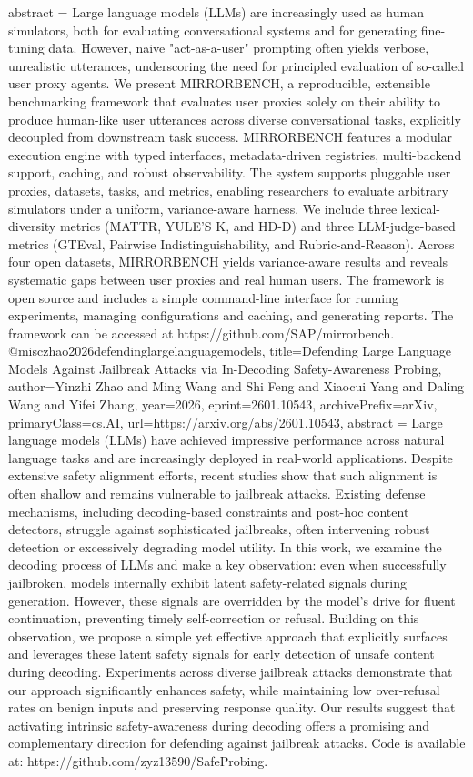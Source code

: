 {      abstract = {Large language models (LLMs) are increasingly used as human simulators, both for evaluating conversational systems and for generating fine-tuning data. However, naive "act-as-a-user" prompting often yields verbose, unrealistic utterances, underscoring the need for principled evaluation of so-called user proxy agents. We present MIRRORBENCH, a reproducible, extensible benchmarking framework that evaluates user proxies solely on their ability to produce human-like user utterances across diverse conversational tasks, explicitly decoupled from downstream task success. MIRRORBENCH features a modular execution engine with typed interfaces, metadata-driven registries, multi-backend support, caching, and robust observability. The system supports pluggable user proxies, datasets, tasks, and metrics, enabling researchers to evaluate arbitrary simulators under a uniform, variance-aware harness. We include three lexical-diversity metrics (MATTR, YULE'S K, and HD-D) and three LLM-judge-based metrics (GTEval, Pairwise Indistinguishability, and Rubric-and-Reason). Across four open datasets, MIRRORBENCH yields variance-aware results and reveals systematic gaps between user proxies and real human users. The framework is open source and includes a simple command-line interface for running experiments, managing configurations and caching, and generating reports. The framework can be accessed at https://github.com/SAP/mirrorbench.}
}@misc{zhao2026defendinglargelanguagemodels,
      title={Defending Large Language Models Against Jailbreak Attacks via In-Decoding Safety-Awareness Probing}, 
      author={Yinzhi Zhao and Ming Wang and Shi Feng and Xiaocui Yang and Daling Wang and Yifei Zhang},
      year={2026},
      eprint={2601.10543},
      archivePrefix={arXiv},
      primaryClass={cs.AI},
      url={https://arxiv.org/abs/2601.10543},
      abstract = {Large language models (LLMs) have achieved impressive performance across natural language tasks and are increasingly deployed in real-world applications. Despite extensive safety alignment efforts, recent studies show that such alignment is often shallow and remains vulnerable to jailbreak attacks. Existing defense mechanisms, including decoding-based constraints and post-hoc content detectors, struggle against sophisticated jailbreaks, often intervening robust detection or excessively degrading model utility. In this work, we examine the decoding process of LLMs and make a key observation: even when successfully jailbroken, models internally exhibit latent safety-related signals during generation. However, these signals are overridden by the model's drive for fluent continuation, preventing timely self-correction or refusal. Building on this observation, we propose a simple yet effective approach that explicitly surfaces and leverages these latent safety signals for early detection of unsafe content during decoding. Experiments across diverse jailbreak attacks demonstrate that our approach significantly enhances safety, while maintaining low over-refusal rates on benign inputs and preserving response quality. Our results suggest that activating intrinsic safety-awareness during decoding offers a promising and complementary direction for defending against jailbreak attacks. Code is available at: https://github.com/zyz13590/SafeProbing.}
}
